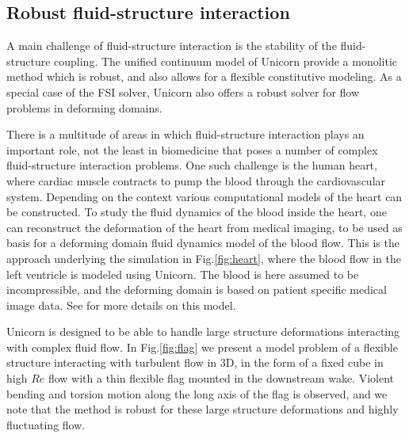 \subsection{Robust fluid-structure interaction}

A main challenge of fluid-structure interaction is the stability of
the fluid-structure coupling. The unified continuum model of Unicorn
provide a monolitic method which is robust, and also allows for a
flexible constitutive modeling.  As a special case of the FSI solver,
Unicorn also offers a robust solver for flow problems in deforming
domains.

There is a multitude of areas in which fluid-structure interaction
plays an important role, not the least in biomedicine that poses a
number of complex fluid-structure interaction problems.  One such
challenge is the human heart, where cardiac muscle contracts to pump
the blood through the cardiovascular system. Depending on the context
various computational models of the heart can be constructed.  To
study the fluid dynamics of the blood inside the heart, one can
reconstruct the deformation of the heart from medical imaging, to be
used as basis for a deforming domain fluid dynamics model of the blood
flow.  This is the approach underlying the simulation in
Fig.\ref{fig:heart}, where the blood flow in the left ventricle is
modeled using Unicorn. The blood is here assumed to be incompressible,
and the deforming domain is based on patient specific medical image
data. See \cite{Aechtner2009} for more details on this model.

Unicorn is designed to be able to handle large structure deformations
interacting with complex fluid flow.  In Fig.\ref{fig:flag} we present
a model problem of a flexible structure interacting with turbulent
flow in 3D, in the form of a fixed cube in high $Re$ flow with a thin
flexible flag mounted in the downstream wake.  Violent bending and
torsion motion along the long axis of the flag is observed, and we
note that the method is robust for these large structure deformations
and highly fluctuating flow.

